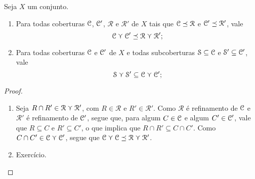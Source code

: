 \begin{proposition}
\label{prop:correfinamento.propriedades}
Seja $X$ um conjunto.
\begin{enumerate}
	\item Para todas coberturas $\mathcal{C}$, $\mathcal{C}'$, $\mathcal{R}$ e $\mathcal{R'}$ de $X$ tais que $\mathcal{C} \preceq \mathcal{R}$ e $\mathcal{C}' \preceq \mathcal{R'}$, vale
		\begin{equation*}
		\mathcal{C} \curlyvee \mathcal{C}' \preceq \mathcal{R} \curlyvee \mathcal{R'};
		\end{equation*}
	\item Para todas coberturas $\mathcal{C}$ e $\mathcal{C}'$ de $X$ e todas subcoberturas $\mathcal{S} \subseteq \mathcal{C}$ e $\mathcal{S'} \subseteq \mathcal{C}'$, vale
		\begin{equation*}
		\mathcal{S} \curlyvee \mathcal{S'} \subseteq \mathcal{C} \curlyvee \mathcal{C}';
		\end{equation*}
\end{enumerate}
\end{proposition}
\begin{proof}
	\begin{enumerate}
	\item Seja $R \cap R' \in \mathcal{R} \curlyvee \mathcal{R'}$, com $R \in \mathcal{R}$ e $R' \in \mathcal{R'}$. Como $\mathcal{R}$ é refinamento de $\mathcal{C}$ e $\mathcal{R'}$ é refinamento de $\mathcal{C}'$, segue que, para algum $C \in \mathcal{C}$ e algum $C' \in \mathcal{C}'$, vale que $R \subseteq C$ e $R' \subseteq C'$, o que implica que $R \cap R' \subseteq C \cap C'$. Como $C \cap C' \in \mathcal{C} \curlyvee \mathcal{C}'$, segue que $\mathcal{C} \curlyvee \mathcal{C} \preceq \mathcal{R} \curlyvee \mathcal{R'}$.

	\item Exercício.
	\end{enumerate}
\end{proof}

